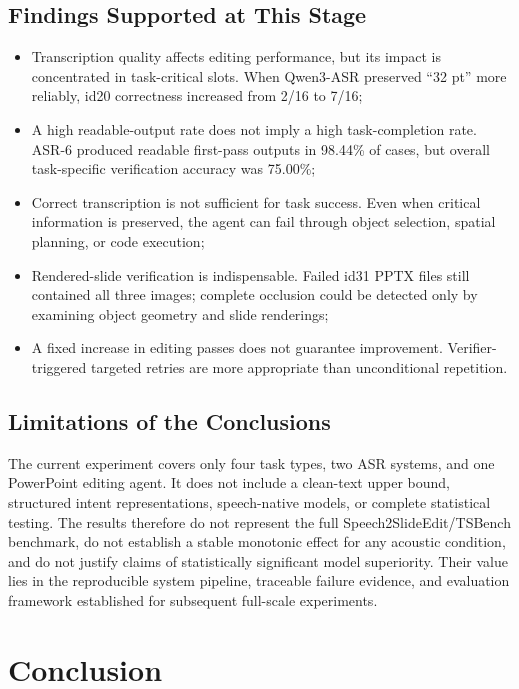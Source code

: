 \documentclass[11pt,a4paper,UTF8,fontset=fandol]{ctexart}
\begin{document}
\subsection{Findings Supported at This Stage}

\begin{itemize}
  \item Transcription quality affects editing performance, but its impact is concentrated in task-critical slots. When Qwen3-ASR preserved ``32 pt'' more reliably, id20 correctness increased from 2/16 to 7/16;
  \item A high readable-output rate does not imply a high task-completion rate. ASR-6 produced readable first-pass outputs in 98.44\% of cases, but overall task-specific verification accuracy was 75.00\%;
  \item Correct transcription is not sufficient for task success. Even when critical information is preserved, the agent can fail through object selection, spatial planning, or code execution;
  \item Rendered-slide verification is indispensable. Failed id31 PPTX files still contained all three images; complete occlusion could be detected only by examining object geometry and slide renderings;
  \item A fixed increase in editing passes does not guarantee improvement. Verifier-triggered targeted retries are more appropriate than unconditional repetition.
\end{itemize}

\subsection{Limitations of the Conclusions}

The current experiment covers only four task types, two ASR systems, and one PowerPoint editing agent. It does not include a clean-text upper bound, structured intent representations, speech-native models, or complete statistical testing. The results therefore do not represent the full Speech2SlideEdit/TSBench benchmark, do not establish a stable monotonic effect for any acoustic condition, and do not justify claims of statistically significant model superiority. Their value lies in the reproducible system pipeline, traceable failure evidence, and evaluation framework established for subsequent full-scale experiments.

\section{Conclusion}
\end{document}
